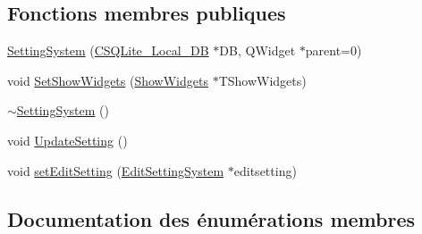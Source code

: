 \subsection*{Fonctions membres publiques}
\begin{DoxyCompactItemize}
\item 
\hyperlink{class_setting_system_a5e05cfbb06519d77fd4eaaae479f4d2e}{Setting\+System} (\hyperlink{class_c_s_q_lite___local___d_b}{C\+S\+Q\+Lite\+\_\+\+Local\+\_\+\+D\+B} $\ast$D\+B, Q\+Widget $\ast$parent=0)
\item 
void \hyperlink{class_setting_system_aeede366e31bc4cadf6ada69bd7059454}{Set\+Show\+Widgets} (\hyperlink{class_show_widgets}{Show\+Widgets} $\ast$T\+Show\+Widgets)
\item 
\hyperlink{class_setting_system_a37eedb8b2569b47387e157ab47653a1f}{$\sim$\+Setting\+System} ()
\item 
void \hyperlink{class_setting_system_a647720ef137e7f93fa77370395a7f0c3}{Update\+Setting} ()
\item 
void \hyperlink{class_setting_system_ae2715f938b1901258dfc993df09d4f94}{set\+Edit\+Setting} (\hyperlink{class_edit_setting_system}{Edit\+Setting\+System} $\ast$editsetting)
\end{DoxyCompactItemize}


\subsection{Documentation des énumérations membres}
\hypertarget{class_setting_system_ad046ad3adffd323e59c0109d59582d76}{}
